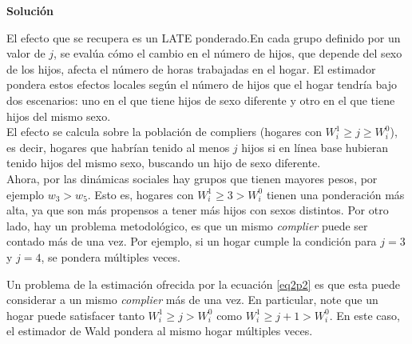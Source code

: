 \documentclass[a4paper, answers, addpoints, 11pt]{exam}
\newenvironment{solucion}{%
  \begin{mdframed}[
    backgroundcolor=blue!5,    %
    linecolor=blue!50,          %
    linewidth=2pt,              %
    leftmargin=10pt,            %
    rightmargin=8pt,           %
    topline=true,              %
    bottomline=true,            %
    roundcorner=10pt,           %
    innerleftmargin=10pt,       %
    innerrightmargin=10pt,      %
    innerbottommargin=10pt,     %
    innertopmargin=10pt         %
  ]%
  \begin{tcolorbox}[colframe=blue!50!black, colback=blue!50, coltitle=white, sharp corners=all, boxrule=1mm, width=\textwidth, halign=left, valign=center, top=0mm, bottom=0mm, left=0mm, right=0mm] \textbf{Solución} \end{tcolorbox} }{\end{mdframed}}
\begin{document}
\begin{enumerate}
            \begin{solucion}
     
El efecto que se recupera es un LATE ponderado.En cada grupo definido por un valor de \( j \), se evalúa cómo el cambio en el número de hijos, que depende del sexo de los hijos, afecta el número de horas trabajadas en el hogar. El estimador pondera estos efectos locales según el número de hijos que el hogar tendría bajo dos escenarios: uno en el que tiene hijos de sexo diferente y otro en el que tiene hijos del mismo sexo.\\

El efecto se calcula sobre la población de compliers (hogares con \( W_i^1 \geq j \geq W_i^0 \)), es decir, hogares que habrían tenido al menos \( j \) hijos si en línea base hubieran tenido hijos del mismo sexo, buscando un hijo de sexo diferente.\\

Ahora, por las dinámicas sociales hay grupos que tienen mayores pesos, por ejemplo $w_3> w_5$. Esto es, hogares con \( W_i^1 \geq 3 > W_i^0 \) tienen una ponderación más alta, ya que son más propensos a tener más hijos con sexos distintos. Por otro lado, hay un problema metodológico, es que un mismo \textit{complier} puede ser contado más de una vez. Por ejemplo, si un hogar cumple la condición para \( j = 3 \) y \( j = 4 \), se pondera múltiples veces.

\end{solucion}
   \end{enumerate}
        
    Un problema de la estimación ofrecida por la ecuación \ref{eq2p2} es que esta puede considerar a un mismo \textit{complier} más de una vez. En particular, note que un hogar puede satisfacer tanto $W_i^1 \geq j > W_i^0$ como $W_i^1 \geq j + 1 > W_i^0$. En este caso, el estimador de Wald pondera al mismo hogar múltiples veces.
\end{document}

